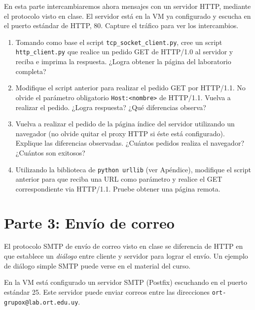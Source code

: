 \documentclass[a4paper,10pt]{article}
\begin{document}
En esta parte intercambiaremos ahora mensajes con un servidor HTTP, mediante el protocolo visto en clase. El servidor está en la VM ya configurado y escucha en el puerto estándar de HTTP, 80. Capture el tráfico para ver los intercambios.

\begin{enumerate}
    \item Tomando como base el script \texttt{tcp\_socket\_client.py}, cree un script \texttt{http\_client.py} que realice un pedido GET de HTTP/1.0 al servidor y reciba e imprima la respuesta. ¿Logra obtener la página del laboratorio completa?
    \item Modifique el script anterior para realizar el pedido GET por HTTP/1.1. No olvide el parámetro obligatorio \texttt{Host:<nombre>} de HTTP/1.1. Vuelva a realizar el pedido. ¿Logra respuesta? ¿Qué diferencias observa?
    \item Vuelva a realizar el pedido de la página índice del servidor utilizando un navegador (no olvide quitar el proxy HTTP si éste está configurado). Explique las diferencias observadas. ¿Cuántos pedidos realiza el navegador? ¿Cuántos son exitosos?
    \item Utilizando la biblioteca de \texttt{python urllib} (ver Apéndice), modifique el script anterior para que reciba una URL como parámetro y realice el GET correspondiente via HTTP/1.1. Pruebe obtener una página remota.
\end{enumerate}

\section*{Parte 3: Envío de correo}

El protocolo SMTP de envío de correo visto en clase se diferencia de HTTP en que establece un \emph{diálogo} entre cliente y servidor para lograr el envío. Un ejemplo de diálogo simple SMTP puede verse en el material del curso.

En la VM está configurado un servidor SMTP (Postfix) escuchando en el puerto estándar 25. Este servidor puede enviar correos entre las direcciones \texttt{ort-grupox@lab.ort.edu.uy}.
\end{document}
